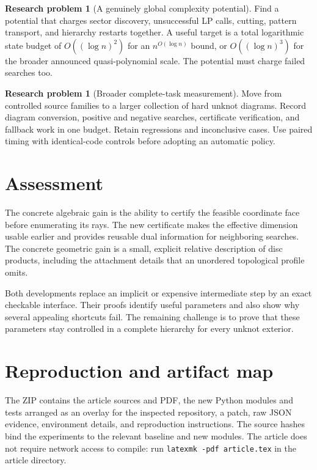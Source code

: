 \documentclass[11pt]{article}
\theoremstyle{definition}
\newtheorem{problem}[theorem]{Research problem}
\theoremstyle{remark}
\newcommand{\code}[1]{\texttt{#1}}
\begin{document}
\begin{problem}[A genuinely global complexity potential]
Find a potential that charges sector discovery, unsuccessful LP calls,
cutting, pattern transport, and hierarchy restarts together. A useful
target is a total logarithmic state budget of \(O((\log n)^2)\) for an
\(n^{O(\log n)}\) bound, or \(O((\log n)^3)\) for the broader announced
quasi-polynomial scale. The potential must charge failed searches too.
\end{problem}

\begin{problem}[Broader complete-task measurement]
Move from controlled source families to a larger collection of hard
unknot diagrams. Record diagram conversion, positive and negative
searches, certificate verification, and fallback work in one budget.
Retain regressions and inconclusive cases. Use paired timing with
identical-code controls before adopting an automatic policy.
\end{problem}

\section{Assessment}

The concrete algebraic gain is the ability to certify the feasible
coordinate face before enumerating its rays. The new certificate
makes the effective dimension usable earlier and provides reusable
dual information for neighboring searches. The concrete geometric
gain is a small, explicit relative description of disc products,
including the attachment details that an unordered topological
profile omits.

Both developments replace an implicit or expensive intermediate step
by an exact checkable interface. Their proofs identify useful
parameters and also show why several appealing shortcuts fail.
The remaining challenge is to prove that these parameters stay
controlled in a complete hierarchy for every unknot exterior.

\appendix
\section{Reproduction and artifact map}
\label{app:reproduction}

The ZIP contains the article sources and PDF, the new Python modules
and tests arranged as an overlay for the inspected repository, a patch,
raw JSON evidence, environment details, and reproduction instructions.
The source hashes bind the experiments to the relevant baseline and
new modules. The article does not require network access to compile:
run \code{latexmk -pdf article.tex} in the article directory.
\end{document}
